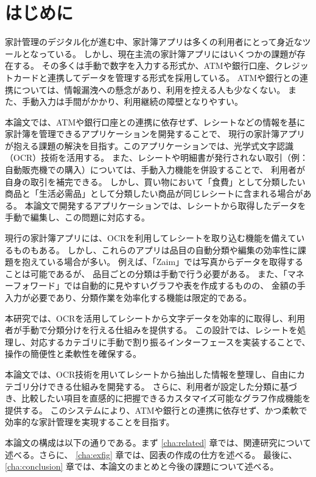 \documentclass[main]{subfiles}
\begin{document}
\chapter{はじめに}
\label{cha:intro}

家計管理のデジタル化が進む中、家計簿アプリは多くの利用者にとって身近なツールとなっている。
しかし、現在主流の家計簿アプリにはいくつかの課題が存在する。
その多くは手動で数字を入力する形式か、ATMや銀行口座、クレジットカードと連携してデータを管理する形式を採用している。
ATMや銀行との連携については、情報漏洩への懸念があり、利用を控える人も少なくない。
また、手動入力は手間がかかり、利用継続の障壁となりやすい。

本論文では、ATMや銀行口座との連携に依存せず、レシートなどの情報を基に家計簿を管理できるアプリケーションを開発することで、
現行の家計簿アプリが抱える課題の解決を目指す。このアプリケーションでは、光学式文字認識（OCR）技術を活用する。
また、レシートや明細書が発行されない取引（例：自動販売機での購入）については、手動入力機能を併設することで、
利用者が自身の取引を補完できる。
しかし、買い物において「食費」として分類したい商品と「生活必需品」として分類したい商品が同じレシートに含まれる場合がある。
本論文で開発するアプリケーションでは、レシートから取得したデータを手動で編集し、この問題に対応する。

現行の家計簿アプリには、OCRを利用してレシートを取り込む機能を備えているものもある。
しかし、これらのアプリは品目の自動分類や編集の効率性に課題を抱えている場合が多い。
例えば、「Zaim」では写真からデータを取得することは可能であるが、
品目ごとの分類は手動で行う必要がある。
また、「マネーフォワード」では自動的に見やすいグラフや表を作成するものの、
金額の手入力が必要であり、分類作業を効率化する機能は限定的である。

本研究では、OCRを活用してレシートから文字データを効率的に取得し、利用者が手動で分類分けを行える仕組みを提供する。
この設計では、レシートを処理し、対応するカテゴリに手動で割り振るインターフェースを実装することで、操作の簡便性と柔軟性を確保する。

本論文では、OCR技術を用いてレシートから抽出した情報を整理し、自由にカテゴリ分けできる仕組みを開発する。
さらに、利用者が設定した分類に基づき、比較したい項目を直感的に把握できるカスタマイズ可能なグラフ作成機能を提供する。
このシステムにより、ATMや銀行との連携に依存せず、かつ柔軟で効率的な家計管理を実現することを目指す。

本論文の構成は以下の通りである。まず \ref{cha:related} 章では、関連研究について述べる。さらに、
\ref{cha:exfig} 章では、図表の作成の仕方を述べる。
最後に、\ref{cha:conclusion} 章では、本論文のまとめと今後の課題について述べる。
\end{document}
